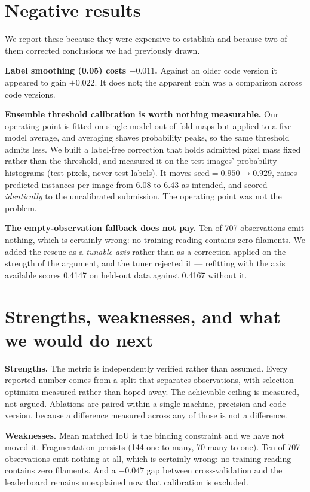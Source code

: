 \section{Negative results}

We report these because they were expensive to establish and because two of
them corrected conclusions we had previously drawn.

\textbf{Label smoothing (0.05) costs $-0.011$.} Against an older code version it
appeared to gain $+0.022$. It does not; the apparent gain was a comparison
across code versions.

\textbf{Ensemble threshold calibration is worth nothing measurable.} Our
operating point is fitted on single-model out-of-fold maps but applied to a
five-model average, and averaging shaves probability peaks, so the same
threshold admits less. We built a label-free correction that holds admitted
pixel mass fixed rather than the threshold, and measured it on the test images'
probability histograms (test pixels, never test labels). It moves
$\text{seed} = 0.950 \rightarrow 0.929$, raises predicted instances per image
from 6.08 to 6.43 as intended, and scored \emph{identically} to the
uncalibrated submission. The operating point was not the problem.

\textbf{The empty-observation fallback does not pay.} Ten of 707 observations
emit nothing, which is certainly wrong: no training reading contains zero
filaments. We added the rescue as a \emph{tunable axis} rather than as a
correction applied on the strength of the argument, and the tuner rejected it ---
refitting with the axis available scores 0.4147 on held-out data against 0.4167
without it.

\section{Strengths, weaknesses, and what we would do next}

\textbf{Strengths.} The metric is independently verified rather than assumed.
Every reported number comes from a split that separates observations, with
selection optimism measured rather than hoped away. The achievable ceiling is
measured, not argued. Ablations are paired within a single machine, precision
and code version, because a difference measured across any of those is not a
difference.

\textbf{Weaknesses.} Mean matched IoU is the binding constraint and we have not
moved it. Fragmentation persists (144 one-to-many, 70 many-to-one). Ten of 707
observations emit nothing at all, which is certainly wrong: no training reading
contains zero filaments. And a $-0.047$ gap between cross-validation and the
leaderboard remains unexplained now that calibration is excluded.

